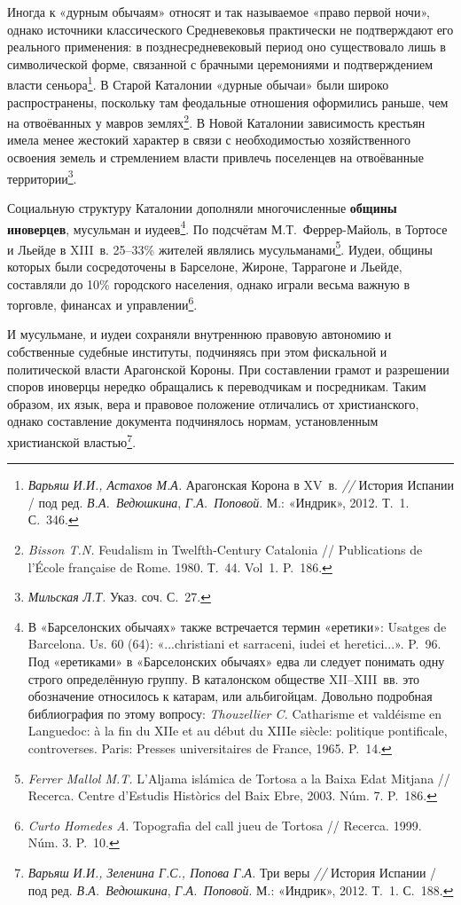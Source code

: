 Иногда к «дурным обычаям» относят и так называемое «право первой ночи», однако источники классического Средневековья практически не подтверждают его реального применения: в позднесредневековый период оно существовало лишь в символической форме, связанной с брачными церемониями и подтверждением власти сеньора\footnote{\emph{Варьяш}\emph{ И.И., Астахов М.А.} Арагонская Корона в XV~в. \emph{// }История Испании / под ред. \emph{В.А.~Ведюшкина}, \emph{Г.А.~Поповой}. М.: «Индрик», 2012. Т.~1. С.~346.}. В Старой Каталонии «дурные обычаи» были широко распространены, поскольку там феодальные отношения оформились раньше, чем на отвоёванных у мавров землях\footnote{\emph{Bisson T.N.} Feudalism in Twelfth-Century Catalonia // Publications de l’École française de Rome. 1980. Т.~44. Vol~1. P.~186.}. В Новой Каталонии зависимость крестьян имела менее жестокий характер в связи с необходимостью хозяйственного освоения земель и стремлением власти привлечь поселенцев на отвоёванные территории\footnote{\emph{Мильская}\emph{ Л.Т.} Указ. соч. С.~27.}.

Социальную структуру Каталонии дополняли многочисленные \textbf{общины иноверцев}, мусульман и иудеев\footnote{В «Барселонских обычаях» также встречается термин «еретики»: Usatges de Barcelona. Us. 60 (64): «...christiani et sarraceni, iudei et heretici...». P.~96. Под «еретиками» в «Барселонских обычаях» едва ли следует понимать одну строго определённую группу. В каталонском обществе XII--XIII~вв. это обозначение относилось к катарам, или альбигойцам. Довольно подробная библиография по этому вопросу: \emph{Thouzellier C. }Catharisme et valdéisme en Languedoc: à la fin du XIIe et au début du XIIIe siècle: politique pontificale, controverses. Paris: Presses universitaires de France, 1965. P.~14.}. По подсчётам М.Т.~Феррер-Майоль, в Тортосе и Льейде в XIII~в. 25--33\% жителей являлись мусульманами\footnote{\emph{Ferrer Mallol M.T.} L'Aljama islámica de Tortosa a la Baixa Edat Mitjana // Recerca. Centre d'Estudis Històrics del Baix Ebre, 2003. Núm. 7. P.~186.}. Иудеи, общины которых были сосредоточены в Барселоне, Жироне, Таррагоне и Льейде, составляли до 10\% городского населения, однако играли весьма важную в торговле, финансах и управлении\footnote{\emph{Curto Homedes A}. Topografia del call jueu de Tortosa // Recerca. 1999. Núm. 3. P.~10.}.

И мусульмане, и иудеи сохраняли внутреннюю правовую автономию и собственные судебные институты, подчиняясь при этом фискальной и политической власти Арагонской Короны. При составлении грамот и разрешении споров иноверцы нередко обращались к переводчикам и посредникам. Таким образом, их язык, вера и правовое положение отличались от христианского, однако составление документа подчинялось нормам, установленным христианской властью\footnote{\emph{Варьяш}\emph{ И.И., Зеленина Г.С., Попова Г.А. }Три веры \emph{// }История Испании / под ред. \emph{В.А.~Ведюшкина}, \emph{Г.А.~Поповой}. М.: «Индрик», 2012. Т.~1. С.~188.}.
